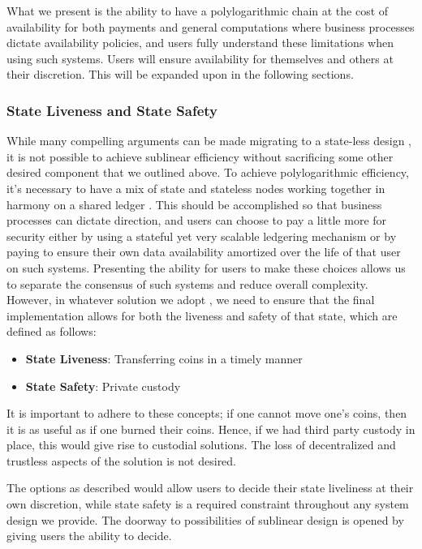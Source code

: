 \documentclass[peerreview]{ieeesyscoin}
\begin{document}
What we present is the ability to have a polylogarithmic chain at the cost of availability for both payments and general computations where business processes dictate availability policies, and users fully understand these limitations when using such systems. Users will ensure availability for themselves and others at their discretion.  This will be expanded upon in the following sections.

\subsubsection{State Liveness and State Safety}

While many compelling arguments can be made migrating to a state-less design \cite{Hot19}, it is not possible to achieve sublinear efficiency without sacrificing some other desired component that we outlined above. To achieve polylogarithmic efficiency, it’s necessary to have a mix of state and stateless nodes working together in harmony on a shared ledger \cite{Hot19}. This should be accomplished so that business processes can dictate direction, and users can choose to pay a little more for security either by using a stateful yet very scalable ledgering mechanism or by paying to ensure their own data availability amortized over the life of that user on such systems. Presenting the ability for users to make these choices allows us to separate the consensus of such systems and reduce overall complexity. However, in whatever solution we adopt , we need to ensure that the final implementation allows for both the liveness and safety of that state, which are defined as follows:

\begin{itemize}
\item \textbf{State Liveness}: Transferring coins in a timely manner
\item \textbf{State Safety}:  Private custody
\end{itemize}

It is important to adhere to these concepts; if one cannot move one’s coins, then it is as useful as if one burned their coins. Hence, if we had third party custody in place, this would give rise to custodial solutions. The loss of decentralized and trustless aspects of the solution is not desired. 

The options as described would allow users to decide their state liveliness at their own discretion, while state safety is a required constraint throughout any system design we provide. The doorway to possibilities of sublinear design is opened by giving users the ability to decide.
\end{document}
